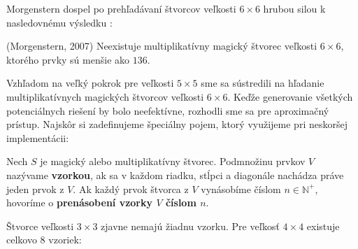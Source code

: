 Morgenstern dospel po prehľadávaní štvorcov veľkosti $6 \times 6$ hrubou silou k nasledovnému výsledku \cite{multimagie}:

\begin{theorem} (Morgenstern, 2007) Neexistuje multiplikatívny magický štvorec veľkosti $6 \times 6$, ktorého prvky sú menšie ako $136$.
\end{theorem}

Vzhľadom na veľký pokrok pre veľkosti $5 \times 5$ sme sa sústredili na hľadanie multiplikatívnych magických štvorcov veľkosti $6 \times 6$. Keďže generovanie všetkých potenciálnych riešení by bolo neefektívne, rozhodli sme sa pre aproximačný prístup. Najskôr si zadefinujeme špeciálny pojem, ktorý využijeme pri neskoršej implementácii:

\begin{definition} Nech $S$ je magický alebo multiplikatívny štvorec. Podmnožinu prvkov $V$ nazývame \textbf{vzorkou}, ak sa v každom riadku, stĺpci a diagonále nachádza práve jeden prvok z $V$. Ak každý prvok štvorca z $V$ vynásobíme číslom $n \in \mathbb{N^+}$, hovoríme o \textbf{prenásobení vzorky $V$ číslom $n$}.
\end{definition}

Štvorce veľkosti $3 \times 3$ zjavne nemajú žiadnu vzorku. Pre veľkosť $4 \times 4$ existuje celkovo $8$ vzoriek: 

